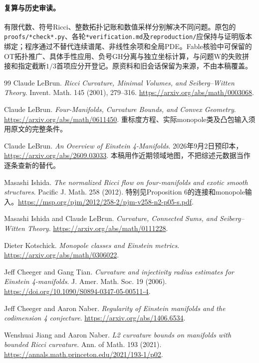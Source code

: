 \documentclass[UTF8,fontset=fandol,zihao=-4]{ctexart}
\theoremstyle{cn}
\begin{document}
\paragraph{复算与历史审读。}
有限代数、符号Ricci、整数拓扑记账和数值采样分别解决不同问题。原包的\nolinkurl{proofs/*check*.py}、各轮\nolinkurl{*verification.md}及\nolinkurl{reproduction/}应保持与证明版本绑定；程序通过不替代连续谱尾、非线性余项和全局PDE。Fable核验中可保留的OT拓扑推广、具体手性应用、负号GH分离与独立坐标计算，与问题W的失败拼接和指定截断$1/3$首项应分开登记。原资料和旧会话保留为来源，不由本稿覆盖。
\begin{thebibliography}{99}
 Claude LeBrun. \emph{Ricci Curvature, Minimal Volumes, and Seiberg--Witten Theory}. Invent. Math. 145 (2001), 279--316. \url{https://arxiv.org/abs/math/0003068}.

 Claude LeBrun. \emph{Four-Manifolds, Curvature Bounds, and Convex Geometry}. \url{https://arxiv.org/abs/math/0611450}. 重标度方程、实际monopole类及凸包输入须用原文的完整条件。

 Claude LeBrun. \emph{An Overview of Einstein 4-Manifolds}. 2026年9月2日预印本，\url{https://arxiv.org/abs/2609.03033}. 本稿用作近期领域地图，不把综述元数据当作逐条查新的替代。

 Masashi Ishida. \emph{The normalized Ricci flow on four-manifolds and exotic smooth structures}. Pacific J. Math. 258 (2012). 特别见Proposition 6的连接和monopole输入。\url{https://msp.org/pjm/2012/258-2/pjm-v258-n2-p05-s.pdf}.

 Masashi Ishida and Claude LeBrun. \emph{Curvature, Connected Sums, and Seiberg--Witten Theory}. \url{https://arxiv.org/abs/math/0111228}.

 Dieter Kotschick. \emph{Monopole classes and Einstein metrics}. \url{https://arxiv.org/abs/math/0306022}.

 Jeff Cheeger and Gang Tian. \emph{Curvature and injectivity radius estimates for Einstein 4-manifolds}. J. Amer. Math. Soc. 19 (2006). \url{https://doi.org/10.1090/S0894-0347-05-00511-4}.

 Jeff Cheeger and Aaron Naber. \emph{Regularity of Einstein manifolds and the codimension 4 conjecture}. \url{https://arxiv.org/abs/1406.6534}.

 Wenshuai Jiang and Aaron Naber. \emph{L2 curvature bounds on manifolds with bounded Ricci curvature}. Ann. of Math. 193 (2021). \url{https://annals.math.princeton.edu/2021/193-1/p02}.


\end{thebibliography}
\end{document}
